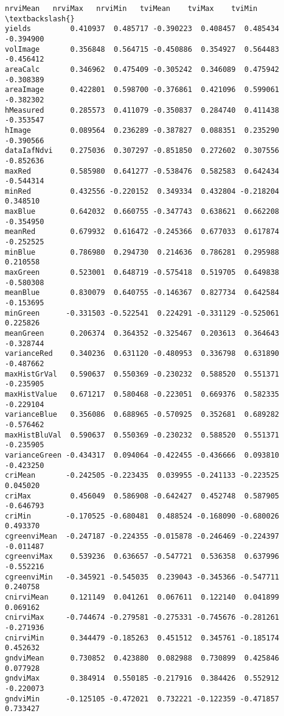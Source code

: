 \documentclass[11pt]{article}
\begin{document}
\begin{Verbatim}[commandchars=\\\{\}]
               nrviMean   nrviMax   nrviMin   tviMean    tviMax    tviMin  \textbackslash{}
yields         0.410937  0.485717 -0.390223  0.408457  0.485434 -0.394900
volImage       0.356848  0.564715 -0.450886  0.354927  0.564483 -0.456412
areaCalc       0.346962  0.475409 -0.305242  0.346089  0.475942 -0.308389
areaImage      0.422801  0.598700 -0.376861  0.421096  0.599061 -0.382302
hMeasured      0.285573  0.411079 -0.350837  0.284740  0.411438 -0.353547
hImage         0.089564  0.236289 -0.387827  0.088351  0.235290 -0.390566
dataIafNdvi    0.275036  0.307297 -0.851850  0.272602  0.307556 -0.852636
maxRed         0.585980  0.641277 -0.538476  0.582583  0.642434 -0.544314
minRed         0.432556 -0.220152  0.349334  0.432804 -0.218204  0.348510
maxBlue        0.642032  0.660755 -0.347743  0.638621  0.662208 -0.354950
meanRed        0.679932  0.616472 -0.245366  0.677033  0.617874 -0.252525
minBlue        0.786980  0.294730  0.214636  0.786281  0.295988  0.210558
maxGreen       0.523001  0.648719 -0.575418  0.519705  0.649838 -0.580308
meanBlue       0.830079  0.640755 -0.146367  0.827734  0.642584 -0.153695
minGreen      -0.331503 -0.522541  0.224291 -0.331129 -0.525061  0.225826
meanGreen      0.206374  0.364352 -0.325467  0.203613  0.364643 -0.328744
varianceRed    0.340236  0.631120 -0.480953  0.336798  0.631890 -0.487662
maxHistGrVal   0.590637  0.550369 -0.230232  0.588520  0.551371 -0.235905
maxHistValue   0.671217  0.580468 -0.223051  0.669376  0.582335 -0.229104
varianceBlue   0.356086  0.688965 -0.570925  0.352681  0.689282 -0.576462
maxHistBluVal  0.590637  0.550369 -0.230232  0.588520  0.551371 -0.235905
varianceGreen -0.434317  0.094064 -0.422455 -0.436666  0.093810 -0.423250
criMean       -0.242505 -0.223435  0.039955 -0.241133 -0.223525  0.045020
criMax         0.456049  0.586908 -0.642427  0.452748  0.587905 -0.646793
criMin        -0.170525 -0.680481  0.488524 -0.168090 -0.680026  0.493370
cgreenviMean  -0.247187 -0.224355 -0.015878 -0.246469 -0.224397 -0.011487
cgreenviMax    0.539236  0.636657 -0.547721  0.536358  0.637996 -0.552216
cgreenviMin   -0.345921 -0.545035  0.239043 -0.345366 -0.547711  0.240758
cnirviMean     0.121149  0.041261  0.067611  0.122140  0.041899  0.069162
cnirviMax     -0.744674 -0.279581 -0.275331 -0.745676 -0.281261 -0.271936
cnirviMin      0.344479 -0.185263  0.451512  0.345761 -0.185174  0.452632
gndviMean      0.730852  0.423880  0.082988  0.730899  0.425846  0.077928
gndviMax       0.384914  0.550185 -0.217916  0.384426  0.552912 -0.220073
gndviMin      -0.125105 -0.472021  0.732221 -0.122359 -0.471857  0.733427

\end{Verbatim}
\end{document}

